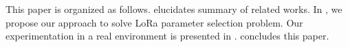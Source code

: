 This paper is organized as follows.
 elucidates summary of related works.
In ,
	we propose our approach to solve LoRa parameter selection problem.
Our experimentation in a real environment is presented in .
 concludes this paper.



